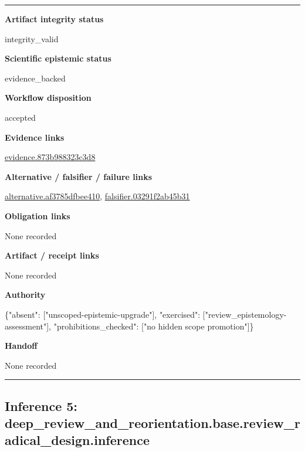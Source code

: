\documentclass[10pt,a4paper]{article}
\newcommand{\TraceField}[2]{\par\noindent\textbf{#1}\par\noindent #2\par\smallskip}
\newenvironment{TraceDossier}{\par\medskip\noindent\hrule\medskip}{\medskip\hrule\par\medskip}
\begin{document}
\begin{TraceDossier}
\TraceField{Artifact integrity status}{integrity\_\allowbreak{}valid}

\TraceField{Scientific epistemic status}{evidence\_\allowbreak{}backed}

\TraceField{Workflow disposition}{accepted}

\TraceField{Evidence links}{\hyperlink{trace-evidence-c1fe2ff89747519290}{evidence.\allowbreak{}873b988323\allowbreak{}c3d8}}

\TraceField{Alternative / falsifier / failure links}{\hyperlink{trace-alternative-eb84208197278877e5}{alternativ\allowbreak{}e.\allowbreak{}af3785dfbe\allowbreak{}e410}, \hyperlink{trace-alternative-872b7b210ee27f9d13}{falsifier.\allowbreak{}03291f2ab4\allowbreak{}5b31}}

\TraceField{Obligation links}{None recorded}

\TraceField{Artifact / receipt links}{None recorded}

\TraceField{Authority}{\{"absent":\allowbreak{} ["unscoped\allowbreak{}-\allowbreak{}epistemic-\allowbreak{}upgrade"],\allowbreak{} "exercised\allowbreak{}":\allowbreak{} ["review\_\allowbreak{}epistemolo\allowbreak{}gy-\allowbreak{}assessment\allowbreak{}"], "prohibiti\allowbreak{}ons\_\allowbreak{}checked":\allowbreak{} ["no hidden scope promotion"\allowbreak{}]\}}

\TraceField{Handoff}{None recorded}

\end{TraceDossier}
\pagebreak[2]\subsection{Inference 5: deep\_\allowbreak{}review\_\allowbreak{}and\_\allowbreak{}reorientat\allowbreak{}ion.\allowbreak{}base.\allowbreak{}review\_\allowbreak{}radical\_\allowbreak{}design.\allowbreak{}inference}\label{trace-inference-bff3fb58404542ddf7}
\end{document}
